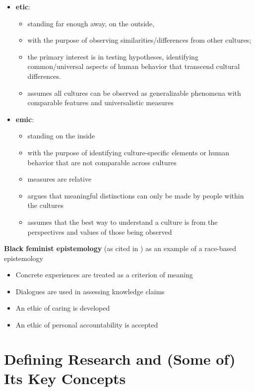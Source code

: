 \documentclass[
  english,
]{book}
\providecommand{\tightlist}{%
  \setlength{\itemsep}{0pt}\setlength{\parskip}{0pt}}
\begin{document}
\begin{itemize}
\tightlist
\item
  \textbf{etic}:

  \begin{itemize}
  \tightlist
  \item
    standing far enough away, on the outside,
  \item
    with the purpose of observing similarities/differences from other cultures;
  \item
    the primary interest is in testing hypotheses, identifying common/universal aspects of human behavior that transcend cultural differences.
  \item
    assumes all cultures can be observed as generalizable phenomena with comparable features and universalistic measures
  \end{itemize}
\item
  \textbf{emic}:

  \begin{itemize}
  \tightlist
  \item
    standing on the inside
  \item
    with the purpose of identifying culture-specific elements or human behavior that are not comparable across cultures
  \item
    measures are relative
  \item
    argues that meaningful distinctions can only be made by people within the cultures
  \item
    assumes that the best way to understand a culture is from the perspectives and values of those being observed
  \end{itemize}
\end{itemize}

\textbf{Black feminist epistemology} (as cited in \citep{hill_collins_black_2000}) as an example of a race-based epistemology

\begin{itemize}
\tightlist
\item
  Concrete experiences are treated as a criterion of meaning
\item
  Dialogues are used in assessing knowledge claims
\item
  An ethic of caring is developed
\item
  An ethic of personal accountability is accepted
\end{itemize}

\hypertarget{defining-research-and-some-of-its-key-concepts}{%
\section{Defining Research and (Some of) Its Key Concepts}\label{defining-research-and-some-of-its-key-concepts}}
\end{document}
